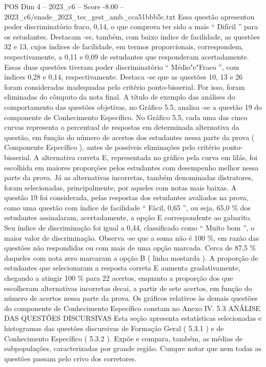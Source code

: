 \begin{textsample}{POS Dim 4 – 2023\_c6 – Score -8.00 – 2023\_c6/enade\_2023\_tec\_gest\_amb\_cca51bbb5c.txt}
Essa questão apresentou poder discriminatório fraco, 0,14, o que comprova ter sido a mais “ Difícil ” para os estudantes.
Destacam -se, também, com baixo índice de facilidade, as questões 32 e 13, cujos índices de facilidade, em termos proporcionais, correspondem, respectivamente, a 0,11 e 0,09 de estudantes que responderam acertadamente.
Essas duas questões tiveram poder discriminatório “ Médio"e"Fraco ”, com índices 0,28 e 0,14, respectivamente.
Destaca -se que as questões 10, 13 e 26 foram consideradas inadequadas pelo critério ponto-bisserial.
Por isso, foram eliminadas do cômputo da nota final.
A título de exemplo das análises do comportamento das questões objetivas, no Gráfico 5.5, analisa -se a questão 19 do componente de Conhecimento Específico.
No Gráfico 5.5, cada uma das cinco curvas representa o percentual de respostas em determinada alternativa da questão, em função do número de acertos dos estudantes nessa parte da prova ( Componente Específico ), antes de possíveis eliminações pelo critério ponto-bisserial.
A alternativa correta E, representada no gráfico pela curva em lilás, foi escolhida em maiores proporções pelos estudantes com desempenho melhor nessa parte da prova.
Já as alternativas incorretas, também denominadas distratores, foram selecionadas, principalmente, por aqueles com notas mais baixas.
A questão 19 foi considerada, pelas respostas dos estudantes avaliados na prova, como uma questão com índice de facilidade “ Fácil, 0,65 ”, ou seja, 65,0 \% dos estudantes assinalaram, acertadamente, a opção E correspondente ao gabarito.
Seu índice de discriminação foi igual a 0,44, classificado como “ Muito bom ”, o maior valor de discriminação.
Observa -se que a soma não é 100 \%, em razão das questões não respondidas ou com mais de uma opção marcada.
Cerca de 87,5 \% daqueles com nota zero marcaram a opção B ( linha mostarda ).
A proporção de estudantes que selecionaram a resposta correta E aumenta gradativamente, chegando a atingir 100 \% para 22 acertos, enquanto a proporção dos que escolheram alternativas incorretas decai, a partir de sete acertos, em função do número de acertos nessa parte da prova.
Os gráficos relativos às demais questões do componente de Conhecimento Específico constam no Anexo IV. 5.3 ANÁLISE DAS QUESTÕES DISCURSIVAS Esta seção apresenta estatísticas selecionadas e histogramas das questões discursivas de Formação Geral ( 5.3.1 ) e de Conhecimento Específico ( 5.3.2 ).
Expõe e compara, também, as médias de subpopulações, caracterizadas por grande região.
Cumpre notar que nem todas as questões passam pelo crivo dos corretores.

\end{textsample}
